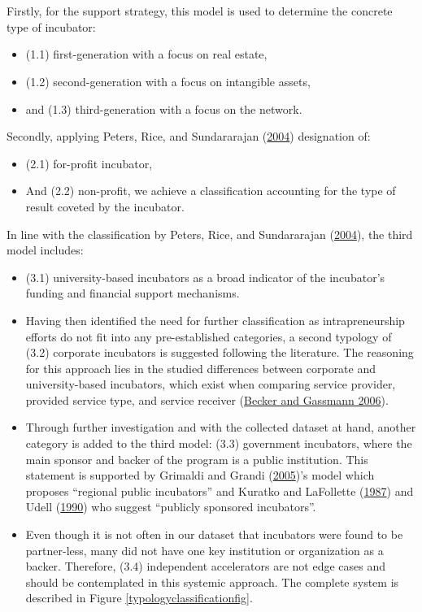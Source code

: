 \documentclass[
  12pt,
]{article}
\begin{document}
~

~

Firstly, for the support strategy, this model is used to determine the concrete type of incubator:

\begin{itemize}
\item
  (1.1) first-generation with a focus on real estate,
\item
  (1.2) second-generation with a focus on intangible assets,
\item
  and (1.3) third-generation with a focus on the network.
\end{itemize}

Secondly, applying Peters, Rice, and Sundararajan (\protect\hyperlink{ref-peters_role_2004}{2004}) designation of:

\begin{itemize}
\item
  (2.1) for-profit incubator,
\item
  And (2.2) non-profit, we achieve a classification accounting for the type of result coveted by the incubator.
\end{itemize}

In line with the classification by Peters, Rice, and Sundararajan (\protect\hyperlink{ref-peters_role_2004}{2004}), the third model includes:

\begin{itemize}
\item
  (3.1) university-based incubators as a broad indicator of the incubator's funding and financial support mechanisms.
\item
  Having then identified the need for further classification as intrapreneurship efforts do not fit into any pre-established categories, a second typology of (3.2) corporate incubators is suggested following the literature. The reasoning for this approach lies in the studied differences between corporate and university-based incubators, which exist when comparing service provider, provided service type, and service receiver (\protect\hyperlink{ref-becker_corporate_2006}{Becker and Gassmann 2006}).
\item
  Through further investigation and with the collected dataset at hand, another category is added to the third model: (3.3) government incubators, where the main sponsor and backer of the program is a public institution. This statement is supported by Grimaldi and Grandi (\protect\hyperlink{ref-grimaldi_business_2005}{2005})'s model which proposes ``regional public incubators'' and Kuratko and LaFollette (\protect\hyperlink{ref-kuratko_small_1987}{1987}) and Udell (\protect\hyperlink{ref-udell_are_1990}{1990}) who suggest ``publicly sponsored incubators''.
\item
  Even though it is not often in our dataset that incubators were found to be partner-less, many did not have one key institution or organization as a backer. Therefore, (3.4) independent accelerators are not edge cases and should be contemplated in this systemic approach. The complete system is described in Figure \ref{typologyclassificationfig}.
\end{itemize}
\end{document}
